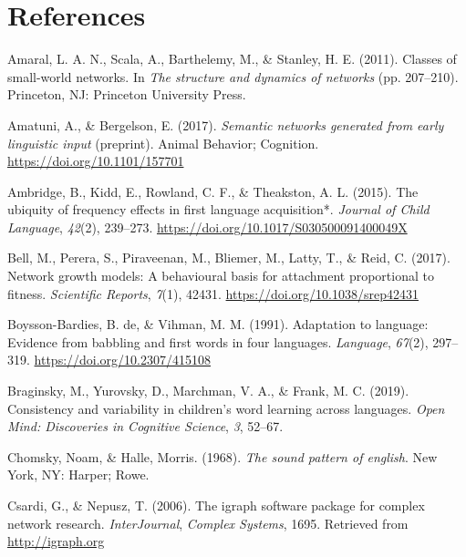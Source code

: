 \documentclass[
  english,
  man,floatsintext]{apa6}
\begin{document}
\newpage

\hypertarget{references}{%
\section{References}\label{references}}

\begingroup
\setlength{\parindent}{-0.5in}
\setlength{\leftskip}{0.5in}

\hypertarget{refs}{}
\leavevmode\hypertarget{ref-amaral_classes_2011}{}%
Amaral, L. A. N., Scala, A., Barthelemy, M., \& Stanley, H. E. (2011). Classes of small-world networks. In \emph{The structure and dynamics of networks} (pp. 207--210). Princeton, NJ: Princeton University Press.

\leavevmode\hypertarget{ref-amatuni_semantic_2017}{}%
Amatuni, A., \& Bergelson, E. (2017). \emph{Semantic networks generated from early linguistic input} (preprint). Animal Behavior; Cognition. \url{https://doi.org/10.1101/157701}

\leavevmode\hypertarget{ref-ambridge_ubiquity_2015}{}%
Ambridge, B., Kidd, E., Rowland, C. F., \& Theakston, A. L. (2015). The ubiquity of frequency effects in first language acquisition*. \emph{Journal of Child Language}, \emph{42}(2), 239--273. \url{https://doi.org/10.1017/S030500091400049X}

\leavevmode\hypertarget{ref-bell_network_2017}{}%
Bell, M., Perera, S., Piraveenan, M., Bliemer, M., Latty, T., \& Reid, C. (2017). Network growth models: A behavioural basis for attachment proportional to fitness. \emph{Scientific Reports}, \emph{7}(1), 42431. \url{https://doi.org/10.1038/srep42431}

\leavevmode\hypertarget{ref-de_boysson-bardies_adaptation_1991}{}%
Boysson-Bardies, B. de, \& Vihman, M. M. (1991). Adaptation to language: Evidence from babbling and first words in four languages. \emph{Language}, \emph{67}(2), 297--319. \url{https://doi.org/10.2307/415108}

\leavevmode\hypertarget{ref-braginsky_consistency_2019}{}%
Braginsky, M., Yurovsky, D., Marchman, V. A., \& Frank, M. C. (2019). Consistency and variability in children's word learning across languages. \emph{Open Mind: Discoveries in Cognitive Science}, \emph{3}, 52--67.

\leavevmode\hypertarget{ref-chomsky_noam_sound_1968}{}%
Chomsky, Noam, \& Halle, Morris. (1968). \emph{The sound pattern of english}. New York, NY: Harper; Rowe.

\leavevmode\hypertarget{ref-R-igraph}{}%
Csardi, G., \& Nepusz, T. (2006). The igraph software package for complex network research. \emph{InterJournal}, \emph{Complex Systems}, 1695. Retrieved from \url{http://igraph.org}
\end{document}
